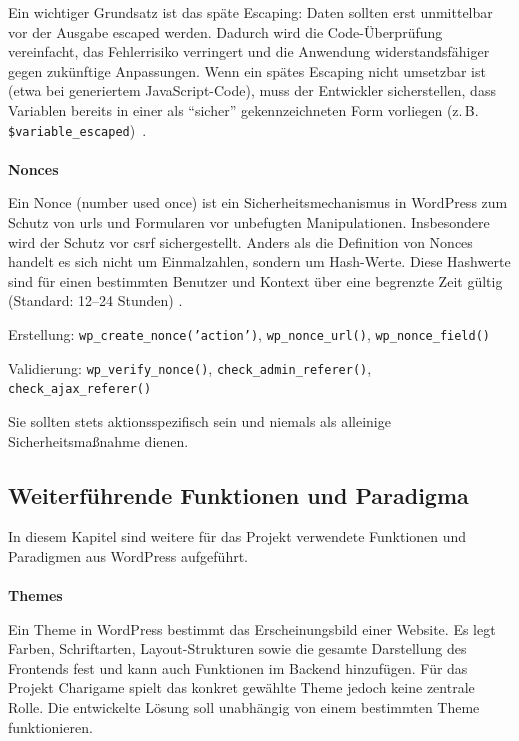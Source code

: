Ein wichtiger Grundsatz ist das späte Escaping: Daten sollten erst unmittelbar vor der Ausgabe escaped werden.
Dadurch wird die Code-Überprüfung vereinfacht, das Fehlerrisiko verringert und die Anwendung widerstandsfähiger gegen zukünftige Anpassungen.
Wenn ein spätes Escaping nicht umsetzbar ist (etwa bei generiertem JavaScript-Code), muss der Entwickler sicherstellen, dass Variablen bereits in einer als \enquote{sicher} gekennzeichneten Form vorliegen (z.\,B. \texttt{\$variable\_escaped})~\cite{wordpress2024escapingcant}.
\\\\
\textbf{Nonces}

Ein Nonce (number used once) ist ein Sicherheitsmechanismus in WordPress zum Schutz von \gls{url}s und Formularen vor unbefugten Manipulationen.
Insbesondere wird der Schutz vor \gls{csrf} sichergestellt.
Anders als die Definition von Nonces handelt es sich nicht um Einmalzahlen, sondern um Hash-Werte.
Diese Hashwerte sind für einen bestimmten Benutzer und Kontext über eine begrenzte Zeit gültig (Standard: 12–24 Stunden) \cite{wordpress2024nonces}.

Erstellung: \texttt{wp\_create\_nonce('action')}, \texttt{wp\_nonce\_url()}, \texttt{wp\_nonce\_field()}

Validierung: \texttt{wp\_verify\_nonce()}, \texttt{check\_admin\_referer()}, \texttt{check\_ajax\_referer()}

Sie sollten stets aktionsspezifisch sein und niemals als alleinige Sicherheitsmaßnahme dienen.

\subsection{Weiterführende Funktionen und Paradigma}
In diesem Kapitel sind weitere für das Projekt verwendete Funktionen und Paradigmen aus WordPress aufgeführt.
\\
\\
\textbf{Themes}

Ein Theme in WordPress bestimmt das Erscheinungsbild einer Website.
Es legt Farben, Schriftarten, Layout-Strukturen sowie die gesamte Darstellung des Frontends fest und kann auch Funktionen im Backend hinzufügen. \cite{wordpress2024theme}
Für das Projekt Charigame spielt das konkret gewählte Theme jedoch keine zentrale Rolle.
Die entwickelte Lösung soll unabhängig von einem bestimmten Theme funktionieren.



